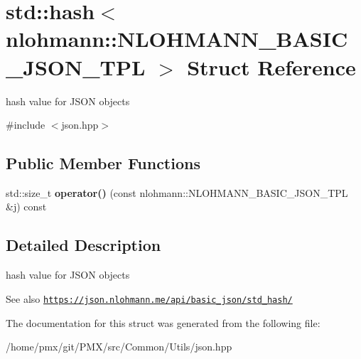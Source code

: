 \hypertarget{structstd_1_1hash_3_01nlohmann_1_1NLOHMANN__BASIC__JSON__TPL_01_4}{}\section{std\+:\+:hash$<$ nlohmann\+:\+:N\+L\+O\+H\+M\+A\+N\+N\+\_\+\+B\+A\+S\+I\+C\+\_\+\+J\+S\+O\+N\+\_\+\+T\+PL $>$ Struct Reference}
\label{structstd_1_1hash_3_01nlohmann_1_1NLOHMANN__BASIC__JSON__TPL_01_4}


hash value for J\+S\+ON objects  




{\ttfamily \#include $<$json.\+hpp$>$}

\subsection*{Public Member Functions}
\begin{DoxyCompactItemize}
\item 
\mbox{\label{structstd_1_1hash_3_01nlohmann_1_1NLOHMANN__BASIC__JSON__TPL_01_4_aeadbcf51ae3e58f8daa2025aa7737dd8}} 
std\+::size\+\_\+t {\bfseries operator()} (const nlohmann\+::\+N\+L\+O\+H\+M\+A\+N\+N\+\_\+\+B\+A\+S\+I\+C\+\_\+\+J\+S\+O\+N\+\_\+\+T\+PL \&j) const
\end{DoxyCompactItemize}


\subsection{Detailed Description}
hash value for J\+S\+ON objects 

\begin{DoxySeeAlso}{See also}
\href{https://json.nlohmann.me/api/basic_json/std_hash/}{\tt https\+://json.\+nlohmann.\+me/api/basic\+\_\+json/std\+\_\+hash/} 
\end{DoxySeeAlso}


The documentation for this struct was generated from the following file\+:\begin{DoxyCompactItemize}
\item 
/home/pmx/git/\+P\+M\+X/src/\+Common/\+Utils/json.\+hpp\end{DoxyCompactItemize}
